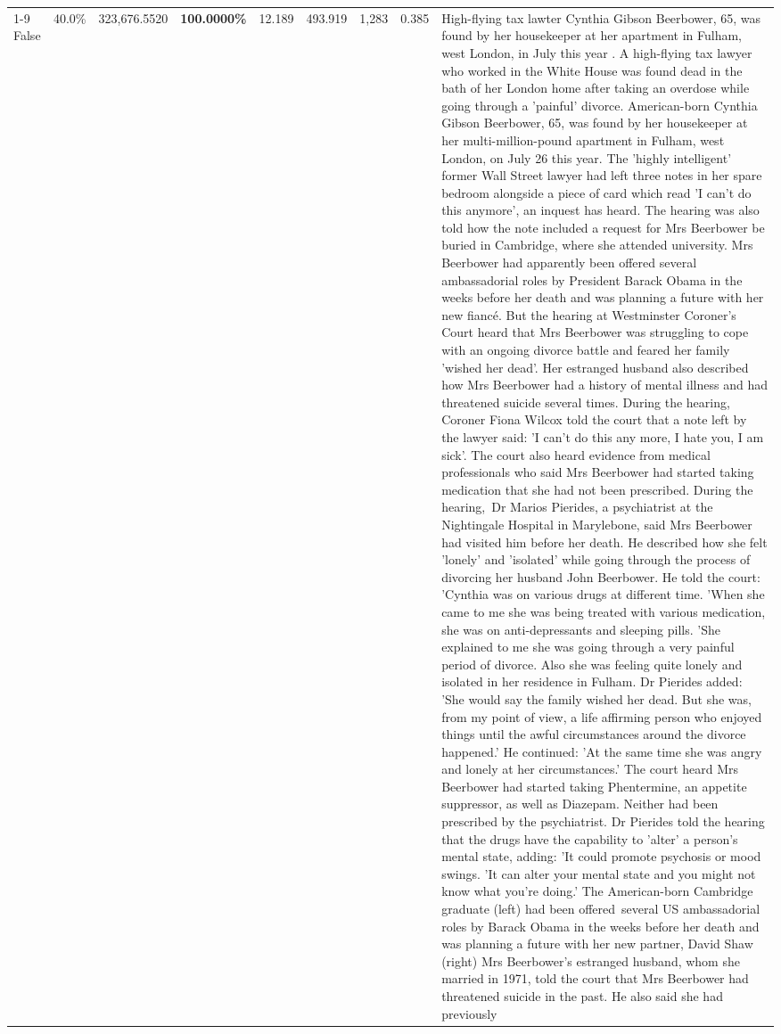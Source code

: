 \begin{table}[H]
\begin{tabular}{lllrlllll}
\cline{1-9}
False & 40.0\% & 323,676.5520 & \bfseries \color{red} 100.0000\% & 12.189 & 493.919 & 1,283 & 0.385 & High-flying tax lawter Cynthia Gibson Beerbower, 65, was found by her housekeeper at her apartment in Fulham, west London, in July this year . A high-flying tax lawyer who worked in the White House was found dead in the bath of her London home after taking an overdose while going through a 'painful' divorce. American-born Cynthia Gibson Beerbower, 65, was found by her housekeeper at her multi-million-pound apartment in Fulham, west London, on July 26 this year. The 'highly intelligent' former Wall Street lawyer had left three notes in her spare bedroom alongside a piece of card which read 'I can't do this anymore', an inquest has heard. The hearing was also told how the note included a request for Mrs Beerbower be buried in Cambridge, where she attended university. Mrs Beerbower had apparently been offered several ambassadorial roles by President Barack Obama in the weeks before her death and was planning a future with her new fiancé. But the hearing at Westminster Coroner's Court heard that Mrs Beerbower was struggling to cope with an ongoing divorce battle and feared her family 'wished her dead'. Her estranged husband also described how Mrs Beerbower had a history of mental illness and had threatened suicide several times. During the hearing, Coroner Fiona Wilcox told the court that a note left by the lawyer said: 'I can't do this any more, I hate you, I am sick'. The court also heard evidence from medical professionals who said Mrs Beerbower had started taking medication that she had not been prescribed. During the hearing, Dr Marios Pierides, a psychiatrist at the Nightingale Hospital in Marylebone, said Mrs Beerbower had visited him before her death. He described how she felt 'lonely' and 'isolated' while going through the process of divorcing her husband John Beerbower. He told the court: 'Cynthia was on various drugs at different time. 'When she came to me she was being treated with various medication, she was on anti-depressants and sleeping pills. 'She explained to me she was going through a very painful period of divorce. Also she was feeling quite lonely and isolated in her residence in Fulham. Dr Pierides added: 'She would say the family wished her dead. But she was, from my point of view, a life affirming person who enjoyed things until the awful circumstances around the divorce happened.' He continued: 'At the same time she was angry and lonely at her circumstances.' The court heard Mrs Beerbower had started taking Phentermine, an appetite suppressor, as well as Diazepam. Neither had been prescribed by the psychiatrist. Dr Pierides told the hearing that the drugs have the capability to 'alter' a person's mental state, adding: 'It could promote psychosis or mood swings. 'It can alter your mental state and you might not know what you're doing.' The American-born Cambridge graduate (left) had been offered several US ambassadorial roles by Barack Obama in the weeks before her death and was planning a future with her new partner, David Shaw (right) Mrs Beerbower's estranged husband, whom she married in 1971, told the court that Mrs Beerbower had threatened suicide in the past. He also said she had previously 
\end{tabular}
\end{table}
